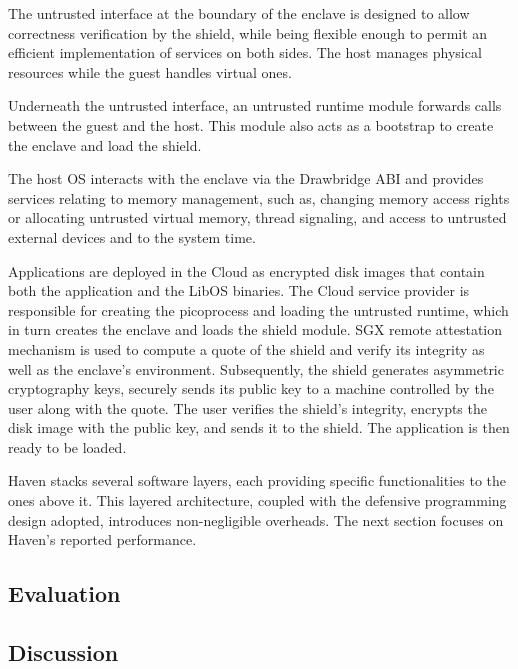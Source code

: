 The untrusted interface at the boundary of the enclave is designed to allow correctness verification by the shield, while being flexible enough to permit an efficient implementation of services on both sides.
The host manages physical resources while the guest handles virtual ones.

Underneath the untrusted interface, an untrusted runtime module forwards calls between the guest and the host.
This module also acts as a bootstrap to create the enclave and load the shield.

The host OS interacts with the enclave via the Drawbridge ABI and provides services relating to memory management, such as, changing memory access rights or allocating untrusted virtual memory, thread signaling, and access to untrusted external devices and to the system time.

Applications are deployed in the Cloud as encrypted disk images that contain both the application and the LibOS binaries.
The Cloud service provider is responsible for creating the picoprocess and loading the untrusted runtime, which in turn creates the enclave and loads the shield module.
SGX remote attestation mechanism is used to compute a quote of the shield and verify its integrity as well as the enclave's environment.
Subsequently, the shield generates asymmetric cryptography keys, securely sends its public key to a machine controlled by the user along with the quote.
The user verifies the shield's integrity, encrypts the disk image with the public key, and sends it to the shield.
The application is then ready to be loaded.

Haven stacks several software layers, each providing specific functionalities to the ones above it.
This layered architecture, coupled with the defensive programming design adopted, introduces non-negligible overheads.
The next section focuses on Haven's reported performance.


\subsection{Evaluation}



\subsection{Discussion}






